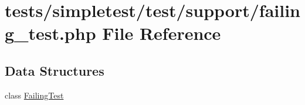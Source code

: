 \hypertarget{failing__test_8php}{\section{tests/simpletest/test/support/failing\-\_\-test.php File Reference}
\label{failing__test_8php}
}
\subsection*{Data Structures}
\begin{DoxyCompactItemize}
\item 
class \hyperlink{class_failing_test}{Failing\-Test}
\end{DoxyCompactItemize}
